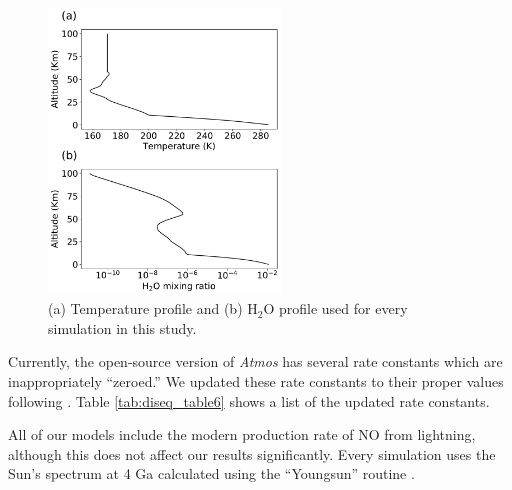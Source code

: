 \begin{figure}
  \centering
  \includegraphics[width=0.55\textwidth]{tex/2diseq/Figure6.pdf}
  \caption{(a) Temperature profile and (b) H$_2$O profile used for every simulation in this study.}
  \label{fig:diseq_figure6}
\end{figure}

Currently, the open-source version of \textit{Atmos} has several rate constants which are inappropriately ``zeroed.'' We updated these rate constants to their proper values following \citet{Harman_2015}. Table \ref{tab:diseq_table6} shows a list of the updated rate constants.

All of our models include the modern production rate of NO from lightning, although this does not affect our results significantly. Every simulation uses the Sun's spectrum at 4 Ga calculated using the ``Youngsun'' routine \citep{Claire_2012}.

